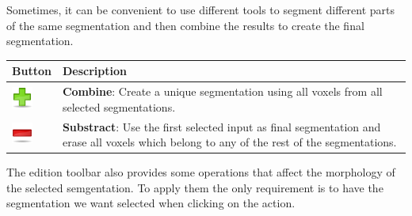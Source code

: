 Sometimes, it can be convenient to use different tools to segment different
parts of the same segmentation and then combine the results to create the final 
segmentation. 
\vspace{0.3cm}

\begin{tabular}{| m{1.3cm} | m{13.5cm} |}
\hline
\textbf{Button} & \textbf{Description}\\
\hline
\includegraphics[width=0.7cm]{../../frontend/rsc/add} &
\textbf{Combine}: Create a unique segmentation using all voxels from all
selected segmentations.\\
\hline
\includegraphics[width=0.7cm]{../../frontend/rsc/remove} &
\textbf{Substract}: Use the first selected input as final segmentation and erase
all voxels which belong to any of the rest of the segmentations.\\
\hline
\end{tabular}
\vspace{0.3cm}

The edition toolbar also provides some operations that affect the morphology of the 
selected semgentation. To apply them the only requirement is to have the segmentation
we want selected when clicking on the action.\\
\vspace{0.3cm}

